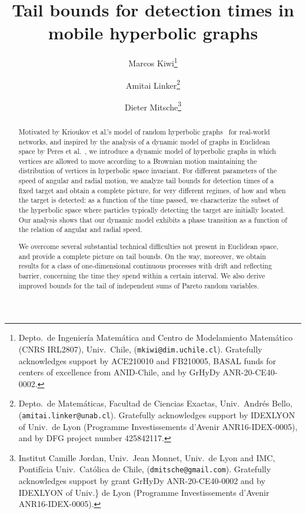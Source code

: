 \documentclass[12pt]{article}
\begin{document}
\nolinenumbers
\title{Tail bounds for detection times in mobile hyperbolic graphs}

\author[1]{Marcos Kiwi\thanks{Depto.~de Ingenier\'ia Matem\'atica and Centro de Modelamiento Matem\'atico (CNRS IRL2807), Univ.~Chile, (\texttt{mkiwi@dim.uchile.cl}). Gratefully acknowledges support by ACE210010 and FB210005, BASAL funds for centers of excellence from ANID-Chile, and by GrHyDy ANR-20-CE40-0002.}}
\author[2]{Amitai Linker\thanks{Depto.~de Matem\'aticas, Facultad de Ciencias Exactas, Univ.\ Andr\'es Bello, (\texttt{amitai.linker@unab.cl}). Gratefully acknowledges support by IDEXLYON of Univ.\ de Lyon (Programme Investissements d'Avenir ANR16-IDEX-0005), and by DFG project number 425842117.}} 
\author[3]{Dieter Mitsche\thanks{Institut Camille Jordan, Univ.\ Jean Monnet, Univ.\ de Lyon and IMC, Pontif\'{i}cia Univ.\ Cat\'{o}lica de Chile, (\texttt{dmitsche@gmail.com}). Gratefully acknowledges support by grant GrHyDy ANR-20-CE40-0002 and by IDEXLYON of Univ.\} de Lyon (Programme Investissements d'Avenir ANR16-IDEX-0005).}}
\maketitle 

\begin{abstract}
Motivated by Krioukov et al.'s model of random hyperbolic graphs~\cite{KPKVB10} for real-world networks, and inspired by the analysis of a dynamic model of graphs in Euclidean space by Peres et al.~\cite{Peres2010}, we introduce a dynamic model of hyperbolic graphs in which vertices are allowed to move according to a Brownian motion maintaining the distribution of vertices in hyperbolic space invariant. For different parameters of the speed of angular and radial motion, we analyze tail bounds for detection times of a fixed target and obtain a complete picture, for very different regimes, of how and when the target is detected: as a function of the time passed, we characterize the subset of the hyperbolic space where particles typically detecting the target are initially located. Our analysis shows that our dynamic model exhibits a phase transition as a function of the relation of angular and radial speed.

We overcome several substantial technical difficulties not present in Euclidean space, and provide a complete picture on tail bounds. On the way, moreover, we obtain results for a class of one-dimensional continuous processes with drift and reflecting barrier, concerning the time they spend within a certain interval. We also derive improved bounds for the tail of independent sums of Pareto random variables.
\end{abstract}
\end{document}

